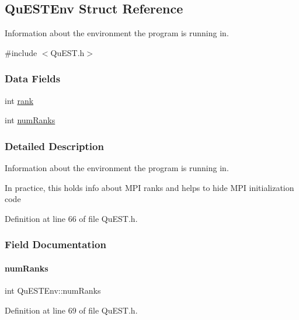 \hypertarget{structQuESTEnv}{}\subsection{Qu\+E\+S\+T\+Env Struct Reference}
\label{structQuESTEnv}


Information about the environment the program is running in.  




{\ttfamily \#include $<$Qu\+E\+S\+T.\+h$>$}

\subsubsection*{Data Fields}
\begin{DoxyCompactItemize}
\item 
int \mbox{\hyperlink{structQuESTEnv_aa648bb336cf8598467cb62db00b9cee8}{rank}}
\item 
int \mbox{\hyperlink{structQuESTEnv_af22aacd7c9905accae28484785c193b4}{num\+Ranks}}
\end{DoxyCompactItemize}


\subsubsection{Detailed Description}
Information about the environment the program is running in. 

In practice, this holds info about M\+PI ranks and helps to hide M\+PI initialization code 

Definition at line 66 of file Qu\+E\+S\+T.\+h.



\subsubsection{Field Documentation}
\mbox{\label{structQuESTEnv_af22aacd7c9905accae28484785c193b4}} 
\paragraph{\texorpdfstring{num\+Ranks}{numRanks}}
{\footnotesize\ttfamily int Qu\+E\+S\+T\+Env\+::num\+Ranks}



Definition at line 69 of file Qu\+E\+S\+T.\+h.



